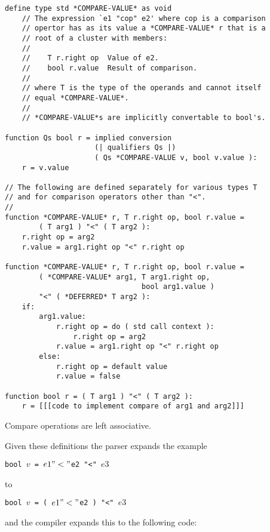 \documentclass[12pt]{article}
\newenvironment{indpar}[1][0.3in]%
	{\begin{list}{}%
		     {\setlength{\itemsep}{0in}%
		      \setlength{\topsep}{0in}%
		      \setlength{\parsep}{1ex}%
		      \setlength{\labelwidth}{#1}%
		      \setlength{\leftmargin}{#1}%
		      \addtolength{\leftmargin}{\labelsep}}%
	 \item}%
	{\end{list}}
\begin{document}
\begin{indpar}\begin{verbatim}
define type std *COMPARE-VALUE* as void
    // The expression `e1 "cop" e2' where cop is a comparison
    // opertor has as its value a *COMPARE-VALUE* r that is a
    // root of a cluster with members:
    //
    //    T r.right op  Value of e2.
    //    bool r.value  Result of comparison.
    //
    // where T is the type of the operands and cannot itself
    // equal *COMPARE-VALUE*.
    //
    // *COMPARE-VALUE*s are implicitly convertable to bool's.

function Qs bool r = implied conversion
                     (| qualifiers Qs |)
                     ( Qs *COMPARE-VALUE v, bool v.value ):
    r = v.value

// The following are defined separately for various types T
// and for comparison operators other than "<".
// 
function *COMPARE-VALUE* r, T r.right op, bool r.value =
        ( T arg1 ) "<" ( T arg2 ):
    r.right op = arg2
    r.value = arg1.right op "<" r.right op

function *COMPARE-VALUE* r, T r.right op, bool r.value =
        ( *COMPARE-VALUE* arg1, T arg1.right op,
                                bool arg1.value )
        "<" ( *DEFERRED* T arg2 ):
    if:
        arg1.value:
            r.right op = do ( std call context ):
                r.right op = arg2
            r.value = arg1.right op "<" r.right op
        else:
            r.right op = default value
            r.value = false

function bool r = ( T arg1 ) "<" ( T arg2 ):
    r = [[[code to implement compare of arg1 and arg2]]]
\end{verbatim}\end{indpar}

Compare operations are left associative.

Given these definitions the parser expands the example
\begin{center}\label{COMPARE-EXAMPLE}
\tt bool $v$ = $e1 "<" $e2 "<" $e3$
\end{center}
to
\begin{center}
\tt bool $v$ = ( $e1 "<" $e2 ) "<" $e3$
\end{center}
and the compiler expands this to the following code:
\end{document}
